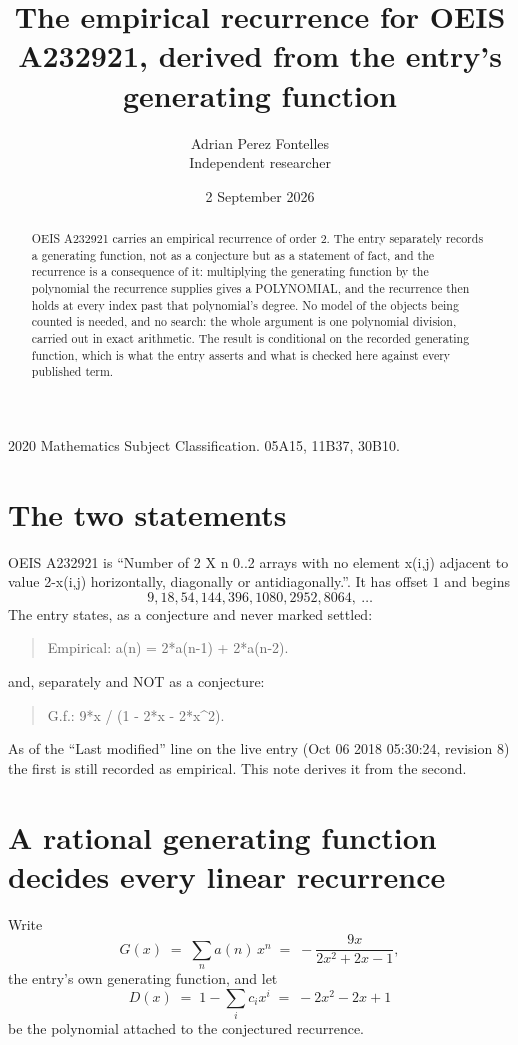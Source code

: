 \documentclass[11pt,a4paper]{article}
\title{The empirical recurrence for OEIS A232921, derived from the entry's generating function}
\author{Adrian Perez Fontelles\\ \small Independent researcher}
\date{2 September 2026}
\theoremstyle{plain}
\theoremstyle{definition}
\begin{document}
\maketitle

\begin{abstract}
OEIS A232921 carries an empirical recurrence of order $2$. The entry separately records a
generating function, not as a conjecture but as a statement of fact, and the recurrence is a
consequence of it: multiplying the generating function by the polynomial the recurrence
supplies gives a POLYNOMIAL, and the recurrence then holds at every index past that
polynomial's degree. No model of the objects being counted is needed, and no search: the
whole argument is one polynomial division, carried out in exact arithmetic. The result is
conditional on the recorded generating function, which is what the entry asserts and what is
checked here against every published term.
\end{abstract}

\noindent\small 2020 Mathematics Subject Classification. 05A15, 11B37, 30B10.\normalsize

\section{The two statements}

OEIS A232921 is ``Number of 2 X n 0..2 arrays with no element x(i,j) adjacent to value 2-x(i,j) horizontally, diagonally or antidiagonally.''. It has offset $1$ and begins
\[
9, 18, 54, 144, 396, 1080, 2952, 8064,\ \dots
\]
The entry states, as a conjecture and never marked settled:
\begin{quote}
Empirical: a(n) = 2*a(n-1) + 2*a(n-2).
\end{quote}
and, separately and NOT as a conjecture:
\begin{quote}
G.f.: 9*x / (1 - 2*x - 2*x\^{}2).
\end{quote}
As of the ``Last modified'' line on the live entry (Oct 06 2018 05:30:24, revision 8) the first is still
recorded as empirical. This note derives it from the second.

\section{A rational generating function decides every linear recurrence}

Write
\[
G(x)\;=\;\sum_{n}a(n)\,x^{n}\;=\;- \frac{9 x}{2 x^{2} + 2 x - 1},
\]
the entry's own generating function, and let
\[
D(x)\;=\;1-\sum_i c_i x^{i}\;=\;- 2 x^{2} - 2 x + 1
\]
be the polynomial attached to the conjectured recurrence.
\end{document}
